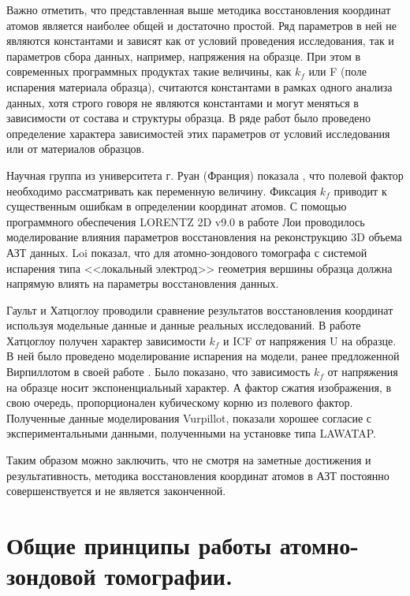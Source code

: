 Важно отметить, что представленная выше методика восстановления координат атомов является наиболее общей и достаточно простой. Ряд параметров в ней не являются константами и зависят как от условий проведения исследования, так и параметров сбора данных, например, напряжения на образце. При этом в современных программных продуктах такие величины, как $k_f$ или F (поле испарения материала образца), считаются константами в рамках одного анализа данных, хотя строго говоря не являются константами и могут меняться в зависимости от состава и структуры образца. В ряде работ было проведено определение характера зависимостей этих параметров от условий исследования или от материалов образцов.

Научная группа из университета г. Руан (Франция) показала \cite{Gault11_Loi}, что полевой фактор необходимо рассматривать как переменную величину. Фиксация $k_f$ приводит к существенным ошибкам в определении координат атомов. С помощью программного обеспечения LORENTZ 2D v9.0 \cite{Asi02} в работе Лои \cite{Loi13} проводилось моделирование влияния параметров восстановления на реконструкцию 3D объема АЗТ данных. Loi показал, что для атомно-зондового томографа с системой испарения типа <<локальный электрод>> геометрия вершины образца должна напрямую влиять на параметры восстановления данных.

Гаульт \cite{Gault11_Loi} и Хатцоглоу \cite{Hatzoglou19} проводили сравнение результатов восстановления координат используя модельные данные и данные реальных исследований. В работе Хатцоглоу \cite{Hatzoglou19} получен характер зависимости $k_f$ и ICF от напряжения U на образце. В ней было проведено моделирование испарения на модели, ранее предложенной Вирпиллотом в своей работе \cite{Vurpillot13}. Было показано, что зависимость $k_f$ от напряжения на образце носит экспоненциальный характер. А фактор сжатия изображения, в свою очередь, пропорционален кубическому корню из полевого фактор. Полученные данные моделирования Vurpillot, показали хорошее согласие с экспериментальными данными, полученными на установке типа LAWATAP.

Таким образом можно заключить, что не смотря на заметные достижения и результативность, методика восстановления координат атомов в АЗТ постоянно совершенствуется и не является законченной. 


\FloatBarrier

\section{Общие принципы работы атомно-зондовой томографии.}\label{sec:ch1/sec4}

